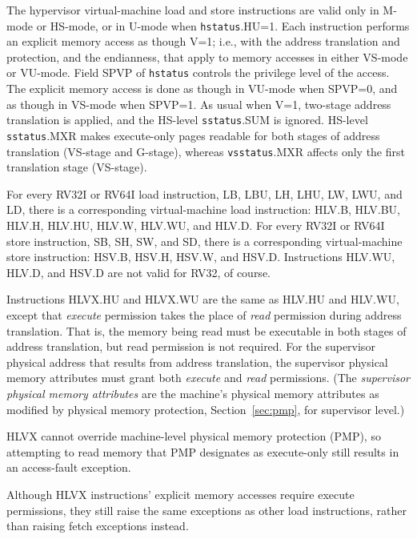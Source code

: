 The hypervisor virtual-machine load and store instructions are valid only
in M-mode or HS-mode, or in U-mode when {\tt hstatus}.HU=1.
Each instruction performs an explicit memory access as though V=1;
i.e., with the address translation and protection, and the endianness,
that apply to memory accesses in either VS-mode or VU-mode.
Field SPVP of {\tt hstatus} controls the privilege level of the access.
The explicit memory access is done as though in VU-mode when SPVP=0, and
as though in VS-mode when SPVP=1.
As usual when V=1, two-stage address translation is applied, and the
HS-level {\tt sstatus}.SUM is ignored.
HS-level {\tt sstatus}.MXR makes execute-only pages readable for
both stages of address translation (VS-stage and G-stage), whereas
{\tt vsstatus}.MXR affects only the first translation stage (VS-stage).

For every RV32I or RV64I load instruction, LB, LBU, LH, LHU, LW, LWU,
and LD, there is a corresponding virtual-machine load instruction:
HLV.B, HLV.BU, HLV.H, HLV.HU, HLV.W, HLV.WU, and HLV.D.
For every RV32I or RV64I store instruction, SB, SH, SW, and SD, there is
a corresponding virtual-machine store instruction:  HSV.B, HSV.H, HSV.W,
and HSV.D.
Instructions HLV.WU, HLV.D, and HSV.D are not valid for RV32, of course.

Instructions HLVX.HU and HLVX.WU are the same as HLV.HU and HLV.WU,
except that \textit{execute} permission takes the place of \textit{read}
permission during address translation.
That is, the memory being read must be executable in both stages of
address translation, but read permission is not required.
For the supervisor physical address that results from address
translation, the supervisor physical memory attributes must grant both
\textit{execute} and \textit{read} permissions.
(The \textit{supervisor physical memory attributes} are the machine's
physical memory attributes as modified by physical memory protection,
Section~\ref{sec:pmp}, for supervisor level.)

\begin{commentary}
HLVX cannot override machine-level physical memory protection (PMP),
so attempting to read memory that PMP designates as execute-only still
results in an access-fault exception.

Although HLVX instructions' explicit memory accesses require execute
permissions, they still raise the same exceptions as other load instructions,
rather than raising fetch exceptions instead.
\end{commentary}

